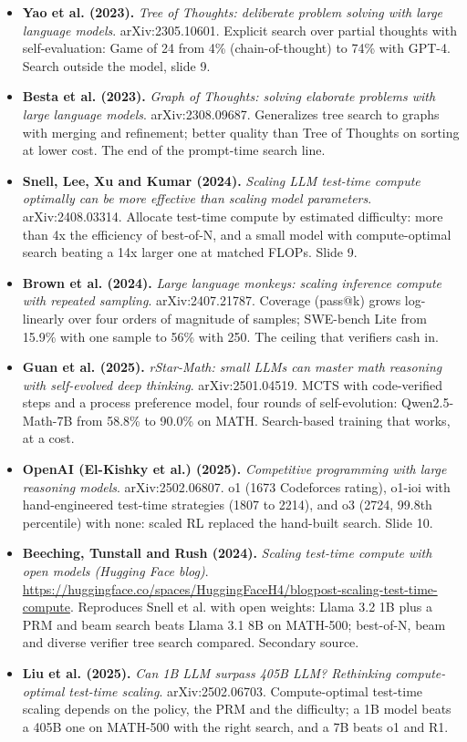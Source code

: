 \documentclass[11pt,letterpaper]{article}
\begin{document}
\begin{itemize}[leftmargin=1.2em,itemsep=3pt]
\item \textbf{Yao et al. (2023).} \textit{Tree of Thoughts: deliberate problem solving with large language models}. arXiv:2305.10601. Explicit search over partial thoughts with self-evaluation: Game of 24 from 4\% (chain-of-thought) to 74\% with GPT-4. Search outside the model, slide 9.
\item \textbf{Besta et al. (2023).} \textit{Graph of Thoughts: solving elaborate problems with large language models}. arXiv:2308.09687. Generalizes tree search to graphs with merging and refinement; better quality than Tree of Thoughts on sorting at lower cost. The end of the prompt-time search line.
\item \textbf{Snell, Lee, Xu and Kumar (2024).} \textit{Scaling LLM test-time compute optimally can be more effective than scaling model parameters}. arXiv:2408.03314. Allocate test-time compute by estimated difficulty: more than 4x the efficiency of best-of-N, and a small model with compute-optimal search beating a 14x larger one at matched FLOPs. Slide 9.
\item \textbf{Brown et al. (2024).} \textit{Large language monkeys: scaling inference compute with repeated sampling}. arXiv:2407.21787. Coverage (pass@k) grows log-linearly over four orders of magnitude of samples; SWE-bench Lite from 15.9\% with one sample to 56\% with 250. The ceiling that verifiers cash in.
\item \textbf{Guan et al. (2025).} \textit{rStar-Math: small LLMs can master math reasoning with self-evolved deep thinking}. arXiv:2501.04519. MCTS with code-verified steps and a process preference model, four rounds of self-evolution: Qwen2.5-Math-7B from 58.8\% to 90.0\% on MATH. Search-based training that works, at a cost.
\item \textbf{OpenAI (El-Kishky et al.) (2025).} \textit{Competitive programming with large reasoning models}. arXiv:2502.06807. o1 (1673 Codeforces rating), o1-ioi with hand-engineered test-time strategies (1807 to 2214), and o3 (2724, 99.8th percentile) with none: scaled RL replaced the hand-built search. Slide 10.
\item \textbf{Beeching, Tunstall and Rush (2024).} \textit{Scaling test-time compute with open models (Hugging Face blog)}. \url{https://huggingface.co/spaces/HuggingFaceH4/blogpost-scaling-test-time-compute}. Reproduces Snell et al. with open weights: Llama 3.2 1B plus a PRM and beam search beats Llama 3.1 8B on MATH-500; best-of-N, beam and diverse verifier tree search compared. Secondary source.
\item \textbf{Liu et al. (2025).} \textit{Can 1B LLM surpass 405B LLM? Rethinking compute-optimal test-time scaling}. arXiv:2502.06703. Compute-optimal test-time scaling depends on the policy, the PRM and the difficulty; a 1B model beats a 405B one on MATH-500 with the right search, and a 7B beats o1 and R1.

\end{itemize}
\end{document}
